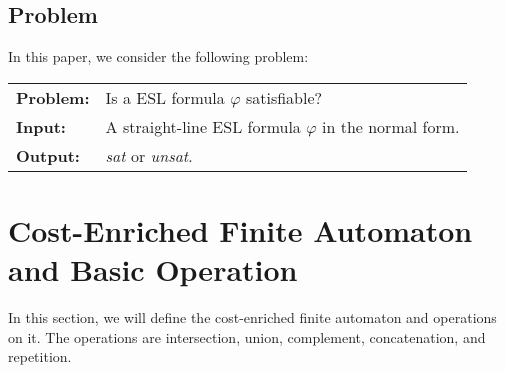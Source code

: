 \documentclass[sigconf]{acmart}
\begin{document}
\subsection{Problem}
In this paper, we consider the following problem:
\begin{table}[h]
  \begin{tabular}{l l}
    \hline
    \textbf{Problem:} & Is a ESL formula $\varphi$ satisfiable?                   \\
    \textbf{Input:}   & A straight-line ESL formula $\varphi$ in the normal form. \\
    \textbf{Output:}  & \emph{sat} or \emph{unsat}.                               \\
    \hline
  \end{tabular}
\end{table}


\section{Cost-Enriched Finite Automaton and Basic Operation} \label{sec:cefa}
In this section, we will define the cost-enriched finite automaton and operations on it. The operations are intersection, union, complement, concatenation, and repetition.
\end{document}
